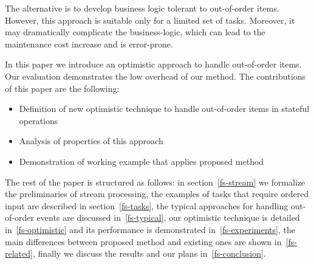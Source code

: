 The alternative is to develop business logic tolerant to out-of-order items. However, this approach is suitable only for a limited set of tasks. Moreover, it may dramatically complicate the business-logic, which can lead to the maintenance cost increase and is error-prone.

In this paper we introduce an optimistic approach to handle out-of-order items. Our evaluation demonstrates the low overhead of our method. The contributions of this paper are the following: 

\begin {itemize}
  \item Definition of new optimistic technique to handle out-of-order items in stateful operations
  \item Analysis of properties of this approach
  \item Demonstration of working example that applies proposed method
\end {itemize}

The rest of the paper is structured as follows: in section~\ref{fs-stream} we formalize the preliminaries of stream processing, the examples of tasks that require ordered input are described in section~\ref{fs-tasks}, the typical approaches for handling out-of-order events are discussed in~\ref{fs-typical}, our optimistic technique is detailed in~\ref{fs-optimistic} and its performance is demonstrated in~\ref{fs-experiments}, the main differences between proposed method and existing ones are shown in~\ref{fs-related}, finally we discuss the results and our plans in~\ref{fs-conclusion}.
